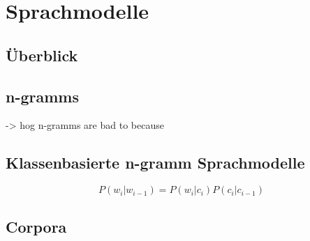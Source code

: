 \section{Sprachmodelle}

    \subsection{Überblick}
    \subsection{n-gramms}
            -> hog n-gramms are bad to because \parencite[470]{cumpatationalLinguistics:classBasedNGramms}
        
	\subsection{Klassenbasierte n-gramm Sprachmodelle}
    \label{sec:brownClustering}
    
    \begin{equation}
   		P(w_i|w_{i-1}) = P(w_i|c_i) P(c_i|c_{i-1})
        \label{eq:wordPropability}
	\end{equation} 
        	
	\subsection{Corpora}
    
